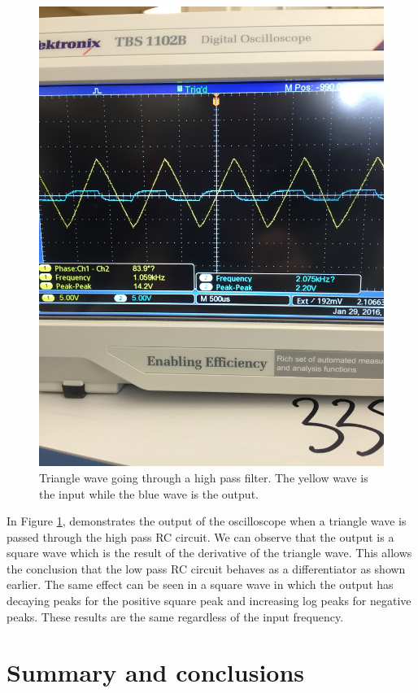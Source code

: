 \documentclass[11pt,letterpaper,onecolumn]{article}
\begin{document}
\begin{figure}[H]
    \centering
    \includegraphics[scale = .1,angle = 270]{image1.JPG}
    \caption{Triangle wave going through a high pass filter. The yellow wave is the input while the blue wave is the output.}
    \label{fig:TriH}
\end{figure}

In Figure \ref{fig:TriH}, demonstrates the output of the oscilloscope when a triangle wave is passed through the high pass RC circuit. We can observe that the output is a square wave which is the result of the derivative of the triangle wave. This allows the conclusion that the low pass RC circuit behaves as a differentiator as shown earlier. The same effect can be seen in a square wave in which the output has decaying peaks for the positive square peak and increasing log peaks for negative peaks. These results are the same regardless of the input frequency.   

\section{Summary and conclusions}
\end{document}
